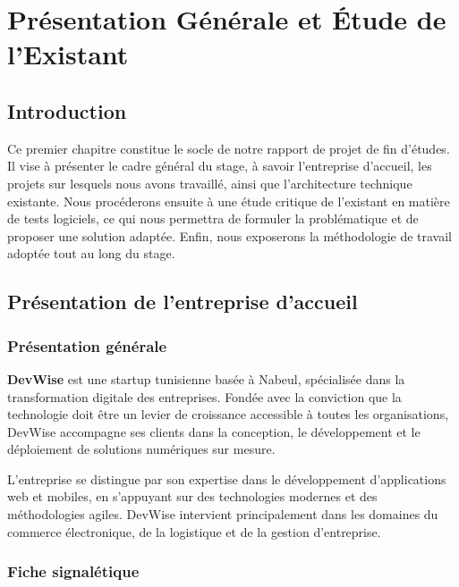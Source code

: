 \chapter{Présentation Générale et Étude de l'Existant}
\label{chap:presentation-etude-existant}

\section*{Introduction}

Ce premier chapitre constitue le socle de notre rapport de projet de fin d'études. Il vise à présenter le cadre général du stage, à savoir l'entreprise d'accueil, les projets sur lesquels nous avons travaillé, ainsi que l'architecture technique existante. Nous procéderons ensuite à une étude critique de l'existant en matière de tests logiciels, ce qui nous permettra de formuler la problématique et de proposer une solution adaptée. Enfin, nous exposerons la méthodologie de travail adoptée tout au long du stage.

\section{Présentation de l'entreprise d'accueil}
\label{sec:presentation-entreprise}

\subsection{Présentation générale}
\label{subsec:presentation-generale-entreprise}

\textbf{DevWise} est une startup tunisienne basée à Nabeul, spécialisée dans la transformation digitale des entreprises. Fondée avec la conviction que la technologie doit être un levier de croissance accessible à toutes les organisations, DevWise accompagne ses clients dans la conception, le développement et le déploiement de solutions numériques sur mesure.

L'entreprise se distingue par son expertise dans le développement d'applications web et mobiles, en s'appuyant sur des technologies modernes et des méthodologies agiles. DevWise intervient principalement dans les domaines du commerce électronique, de la logistique et de la gestion d'entreprise.

\subsection{Fiche signalétique}
\label{subsec:fiche-signaletique}

